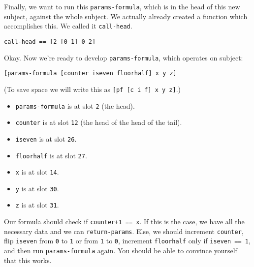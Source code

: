 \documentclass[twoside]{article}
\begin{document}
\noindent
Finally, we want to run this \lstinline[style=inlinecode]{params-formula}, which is in the head of this new subject, against the whole subject. We actually already created a function which accomplishes this. We called it \lstinline[style=inlinecode]{call-head}.

\begin{lstlisting}[style=listingblock]
call-head == [2 [0 1] 0 2]
\end{lstlisting}

Okay. Now we're ready to develop \lstinline[style=inlinecode]{params-formula}, which operates on subject:

\begin{lstlisting}[style=listingblock]
[params-formula [counter iseven floorhalf] x y z]
\end{lstlisting}

\noindent
(To save space we will write this as \lstinline[style=inlinecode]{[pf [c i f] x y z]}.)

\begin{itemize}
  \item \lstinline[style=inlinecode]{params-formula} is at slot \lstinline[style=inlinecode]{2} (the head).
  \item \lstinline[style=inlinecode]{counter} is at slot \lstinline[style=inlinecode]{12} (the head of the head of the tail).
  \item \lstinline[style=inlinecode]{iseven} is at slot \lstinline[style=inlinecode]{26}.
  \item \lstinline[style=inlinecode]{floorhalf} is at slot \lstinline[style=inlinecode]{27}.
  \item \lstinline[style=inlinecode]{x} is at slot \lstinline[style=inlinecode]{14}.
  \item \lstinline[style=inlinecode]{y} is at slot \lstinline[style=inlinecode]{30}.
  \item \lstinline[style=inlinecode]{z} is at slot \lstinline[style=inlinecode]{31}.
\end{itemize}

Our formula should check if \lstinline[style=inlinecode]{counter+1 == x}. If this is the case, we have all the necessary data and we can \lstinline[style=inlinecode]{return-params}. Else, we should increment \lstinline[style=inlinecode]{counter}, flip \lstinline[style=inlinecode]{iseven} from \lstinline[style=inlinecode]{0} to \lstinline[style=inlinecode]{1} or from \lstinline[style=inlinecode]{1} to \lstinline[style=inlinecode]{0}, increment \lstinline[style=inlinecode]{floorhalf} only if \lstinline[style=inlinecode]{iseven == 1}, and then run \lstinline[style=inlinecode]{params-formula} again. You should be able to convince yourself that this works.
\end{document}
